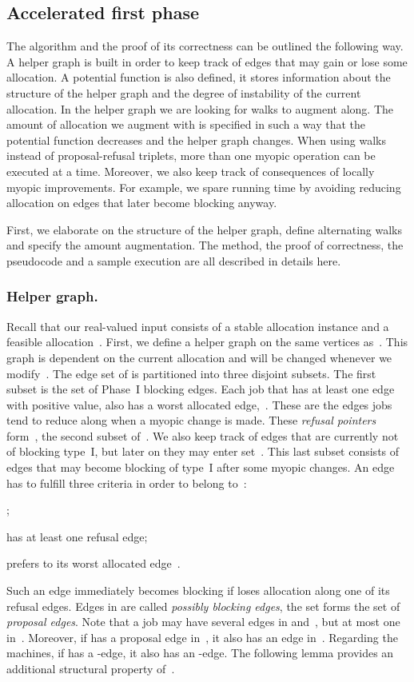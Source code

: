 \documentclass{llncs}
\begin{document}
\subsection{Accelerated first phase}

The algorithm and the proof of its correctness can be outlined the following way. A helper graph is built in order to keep track of edges that may gain or lose some allocation. A potential function is also defined, it stores information about the structure of the helper graph and the degree of instability of the current allocation. In the helper graph we are looking for walks to augment along. The amount of allocation we augment with is specified in such a way that the potential function decreases and the helper graph changes. When using walks instead of proposal-refusal triplets, more than one myopic operation can be executed at a time. Moreover, we also keep track of consequences of locally myopic improvements. For example, we spare running time by avoiding reducing allocation on edges that later become blocking anyway.

First, we elaborate on the structure of the helper graph, define alternating walks and specify the amount augmentation. The method, the proof of correctness, the pseudocode and a sample execution are all described in details here.



\subsubsection*{Helper graph.}
Recall that our real-valued input  consists of a stable allocation instance  and a feasible allocation~. First, we define a helper graph  on the same vertices as~. This graph is dependent on the current allocation  and will be changed whenever we modify~. The edge set of  is partitioned into three disjoint subsets. The first subset  is the set of Phase~I blocking edges. Each job  that has at least one edge with positive  value, also has a worst allocated edge,~. These are the edges jobs tend to reduce  along when a myopic change is made. These \emph{refusal pointers} form~, the second subset of~. We also keep track of edges that are currently not of blocking type~I, but later on they may enter set~. This last subset  consists of edges that may become blocking of type~I after some myopic changes. An edge  has to fulfill three criteria in order to belong to~: \begin{inparaenum}[1)]
    \item ;
    \item  has at least one refusal edge;
    \item  prefers  to its worst allocated edge~.
  \end{inparaenum}
Such an edge immediately becomes blocking if  loses allocation along one of its refusal edges. Edges in  are called \emph{possibly blocking edges}, the set  forms the set of \emph{proposal edges}. Note that a job  may have several edges in  and~, but at most one in~. Moreover, if  has a proposal edge in~, it also has an edge in~. Regarding the machines, if  has a -edge, it also has an -edge. The following lemma provides an additional structural property of~.
\end{document}

